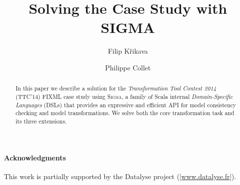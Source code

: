 \documentclass[submission]{eptcs}
\title{Solving the \TTC \FIXML Case Study with SIGMA}
\author{
  Filip Křikava
  \institute{University Lille 1 - LIFL, France}
  \institute{INRIA Lille, Nord Europe}
  \email{\href{mailto:filip.krikava@inria.fr}{filip.krikava@inria.fr}}
\and
  Philippe Collet
  \institute{Université Nice - Sophia Antipolis, France}
  \institute{CNRS, I3S, UMR 7271}
  \email{\quad \href{mailto:philippe.collet@unice.fr}{philippe.collet@unice.fr}}
}
\newcommand{\SIGMA}{\textsc{Sigma}\xspace}
\newcommand{\TTC}{TTC'14\xspace}
\newcommand{\Scala}{\scalainline}
\begin{document}
\maketitle

\begin{abstract}
In this paper we describe a solution for the \emph{Transformation Tool Contest 2014} (\TTC) FIXML case study using \SIGMA, a family of Scala internal \emph{Domain-Specific Languages} (DSLs) that provides an expressive and efficient API for model consistency checking and model transformations.
We solve both the core transformation task and its three extensions.
\end{abstract}






\vspace*{-3mm}
\paragraph{Acknowledgments}
This work is partially supported by the Datalyse project (\href{http://www.datalyse.fr/}{\Scala|www.datalyse.fr|}).
\vspace*{-3mm}


	

\appendix


\end{document}
